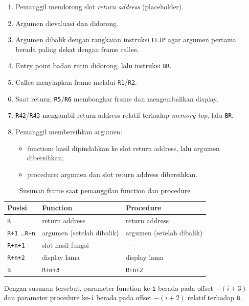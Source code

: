 \documentclass[11pt,a4paper]{article}
\begin{document}
\begin{enumerate}
  \item Pemanggil mendorong slot \textit{return address} (placeholder).
  \item Argumen dievaluasi dan didorong.
  \item Argumen dibalik dengan rangkaian instruksi \texttt{FLIP} agar
        argumen pertama berada paling dekat dengan frame callee.
  \item Entry point badan rutin didorong, lalu instruksi \texttt{BR}.
  \item Callee menyiapkan frame melalui \texttt{R1}/\texttt{R2}.
  \item Saat return, \texttt{R5}/\texttt{R6} membongkar frame dan
        mengembalikan display.
  \item \texttt{R42}/\texttt{R43} mengambil return address relatif
        terhadap \textit{memory top}, lalu \texttt{BR}.
  \item Pemanggil membersihkan argumen:
        \begin{itemize}
          \item function: hasil dipindahkan ke slot return address,
                lalu argumen dibersihkan;
          \item procedure: argumen dan slot return address dibersihkan.
        \end{itemize}
\end{enumerate}

\begin{table}[ht]
\centering
\caption{Susunan frame saat pemanggilan function dan procedure}
\label{tab:frame}
\begin{tabularx}{\linewidth}{@{}lXX@{}}
\toprule
\textbf{Posisi} & \textbf{Function} & \textbf{Procedure} \\
\midrule
\texttt{R}                 & return address & return address \\
\texttt{R+1} \ldots \texttt{R+n} & argumen (setelah dibalik)
                           & argumen (setelah dibalik) \\
\texttt{R+n+1}             & slot hasil fungsi & --- \\
\texttt{R+n+2}             & display lama & display lama \\
\texttt{B}                 & \texttt{R+n+3} & \texttt{R+n+2} \\
\bottomrule
\end{tabularx}
\end{table}

Dengan susunan tersebut, parameter function ke-\texttt{i} berada pada
offset $-(i+3)$ dan parameter procedure ke-\texttt{i} berada pada
offset $-(i+2)$ relatif terhadap \texttt{B}.
\end{document}
